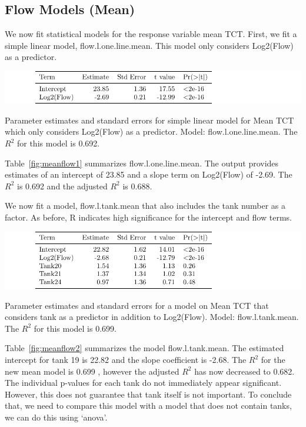 \subsection{Flow Models (Mean)}

We now fit statistical models for the response variable mean TCT. First, we fit a simple linear model, flow.l.one.line.mean. This model only considers Log2(Flow) as a predictor.

\vspace{5mm}


\begin{table}[H]
\includegraphics{Chapter4Images/flowlonelinemean.pdf}
\caption{Parameter estimates and standard errors for simple linear model for Mean TCT which only considers Log2(Flow) as a predictor. Model: flow.l.one.line.mean. The $R^{2}$ for this model is 0.692.}
\label{fig:meanflow1}
\end{table}

Table~\ref{fig:meanflow1} summarizes flow.l.one.line.mean. The output provides estimates of an intercept of 23.85 and a slope term on Log2(Flow) of -2.69. The $ R^{2}$ is 0.692 and the adjusted $R^{2}$ is 0.688.
 

\newpage

We now fit a model, flow.l.tank.mean that also includes the tank number as a factor.  As before, R indicates high significance for the intercept and flow terms.

\vspace{5mm}

\begin{table}[H]
\includegraphics{Chapter4Images/flowltankmean.pdf}
\caption{Parameter estimates and standard errors for a model on Mean TCT that considers tank as a predictor in addition to Log2(Flow). Model: flow.l.tank.mean. The $R^{2}$ for this model is 0.699.}
\label{fig:meanflow2}
\end{table}

Table~\ref{fig:meanflow2} summarizes the model flow.l.tank.mean. The estimated intercept for tank 19  is 22.82 and the slope coefficient is -2.68. The $R^{2}$ for the new mean model is 0.699 , however the adjusted $R^{2}$ has now decreased to 0.682. The individual p-values for each tank do not immediately  appear significant. However, this does not guarantee that tank itself is not important. To conclude that, we need to compare this model with a model that does not contain tanks, we can do this using `anova'.
  


